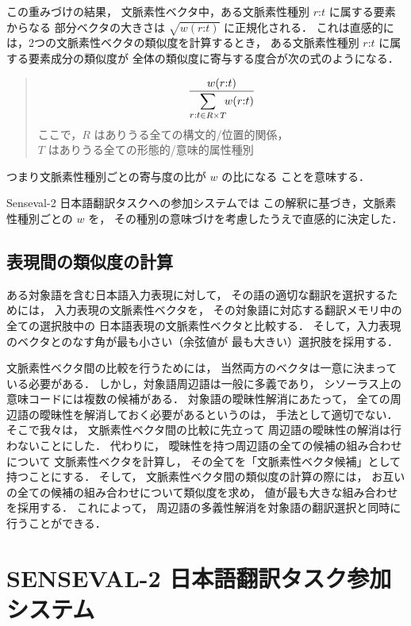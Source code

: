 この重みづけの結果，
文脈素性ベクタ中，ある文脈素性種別 $r$:$t$ に属する要素からなる
部分ベクタの大きさは $\sqrt{w(\mbox{$r$:$t$})}$ に正規化される．
これは直感的には，2つの文脈素性ベクタの類似度を計算するとき，
ある文脈素性種別 $r$:$t$ に属する要素成分の類似度が
全体の類似度に寄与する度合が次の式のようになる．
\begin{quote}
 \[
  \frac{w(\mbox{$r$:$t$})}
       {\displaystyle\sum_{\mbox{\footnotesize $r$:$t$\/} \in R \times T}
                     \!\!w(\mbox{$r$:$t$})}
 \]
 ここで，$R$ はありうる全ての構文的/位置的関係，\\
 $T$ はありうる全ての形態的/意味的属性種別
\end{quote}
つまり文脈素性種別ごとの寄与度の比が $w$ の比になる
ことを意味する．

{\sc Senseval}-2 日本語翻訳タスクへの参加システムでは
この解釈に基づき，文脈素性種別ごとの $w$ を，
その種別の意味づけを考慮したうえで直感的に決定した．


\subsection{表現間の類似度の計算}
\label{sec:candidate}
ある対象語を含む日本語入力表現に対して，
その語の適切な翻訳を選択するためには，
入力表現の文脈素性ベクタを，
その対象語に対応する翻訳メモリ中の全ての選択肢中の
日本語表現の文脈素性ベクタと比較する．
そして，入力表現のベクタとのなす角が最も小さい（余弦値が
最も大きい）選択肢を採用する．

文脈素性ベクタ間の比較を行うためには，
当然両方のベクタは一意に決まっている必要がある．
しかし，対象語周辺語は一般に多義であり，
シソーラス上の意味コードには複数の候補がある．
対象語の曖昧性解消にあたって，
全ての周辺語の曖昧性を解消しておく必要があるというのは，
手法として適切でない．
そこで我々は，
文脈素性ベクタ間の比較に先立って
周辺語の曖昧性の解消は行わないことにした．
代わりに，
曖昧性を持つ周辺語の全ての候補の組み合わせについて
文脈素性ベクタを計算し，
その全てを「文脈素性ベクタ候補」として持つことにする．
そして，
文脈素性ベクタ間の類似度の計算の際には，
お互いの全ての候補の組み合わせについて類似度を求め，
値が最も大きな組み合わせを採用する．
これによって，
周辺語の多義性解消を対象語の翻訳選択と同時に行うことができる．


\section{
	 S{\normalsize\bf ENSEVAL}-2 日本語翻訳タスク参加システム}
\label{sec:senseval_result}


